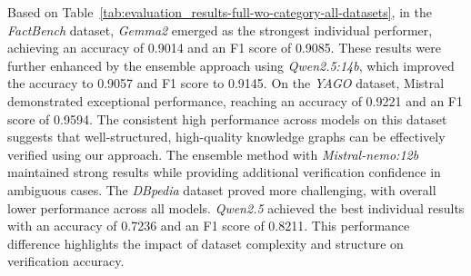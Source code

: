 Based on Table~\ref{tab:evaluation_results-full-wo-category-all-datasets}, in the \textit{FactBench} dataset, \textit{Gemma2} emerged as the strongest individual performer, achieving an accuracy of 0.9014 and an F1 score of 0.9085.
These results were further enhanced by the ensemble approach using \textit{Qwen2.5:14b}, which improved the accuracy to 0.9057 and F1 score to 0.9145.
On the \textit{YAGO} dataset, Mistral demonstrated exceptional performance, reaching an accuracy of 0.9221 and an F1 score of 0.9594.
The consistent high performance across models on this dataset suggests that well-structured, high-quality knowledge graphs can be effectively verified using our approach.
The ensemble method with \textit{Mistral-nemo:12b} maintained strong results while providing additional verification confidence in ambiguous cases.
The \textit{DBpedia} dataset proved more challenging, with overall lower performance across all models.
\textit{Qwen2.5} achieved the best individual results with an accuracy of 0.7236 and an F1 score of 0.8211.
This performance difference highlights the impact of dataset complexity and structure on verification accuracy.

